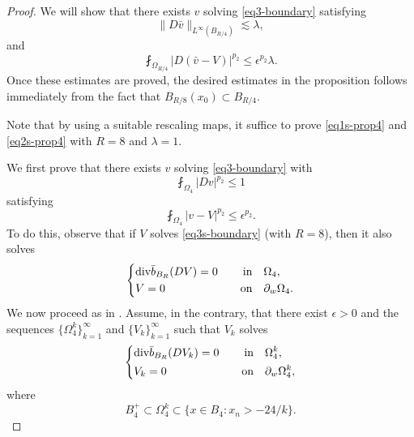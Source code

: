 \documentclass[a4paper,10pt]{amsart}
\newcommand{\lesi}{\lesssim}
\newcommand{\Om}{\Omega}
\newcommand{\vc}{\infty}
\newcommand{\di}{{\rm div}}
\begin{document}
\begin{proof}
	
	We will show that there exists $v$ solving \eqref{eq3-boundary} satisfying
	\begin{equation}\label{eq1s-prop4}
	\|D\bar{v}\|_{L^{\vc}(B_{R/4})}\lesi \lambda,
	\end{equation}
	and
	\begin{equation}
	\label{eq2s-prop4}
	\fint_{\Om_{R/4}}|D(\bar{v}-V)|^{p_2}\leq \epsilon^{p_2}\lambda.
	\end{equation}
	Once these estimates are proved, the desired estimates in the proposition follows 
	immediately from the fact that $B_{R/8}(x_0)\subset B_{R/4}$.
	
Note that by using a suitable rescaling maps, it suffice to prove \eqref{eq1s-prop4} and \eqref{eq2s-prop4} with $R=8$ and $\lambda=1$.

We first prove that there exists $v$ solving \eqref{eq3-boundary} with
	\begin{equation}\label{eq1s-prop3}
	\fint_{\Om_4}|Dv|^{p_2}\leq 1
	\end{equation}
	satisfying
	\begin{equation}\label{eq2s-prop3}
	\fint_{\Om_4}|v-V|^{p_2}\leq \epsilon^{p_2}.
	\end{equation}
	To do this, observe  that if $V$ solves \eqref{eq3s-boundary} (with $R=8$), then it also solves
	\begin{equation}\label{eq2s-boundary}
	\left\{
	\begin{aligned}
	&\di \bar{b}_{B_R}(DV)=0 \quad &\text{in}& \quad \Om_{4},\\
	&V=0  \quad &\text{on}& \quad \partial_w \Om_{4}.
	\end{aligned}
	\right.
	\end{equation}
		We now proceed as in \cite{BW, BOR}. Assume, in the contrary, that there exist $\epsilon>0$ and the sequences $\{\Om_4^k\}_{k=1}^\vc$ and $\{V_k\}_{k=1}^\vc$ such that $V_k$ solves 
	\begin{equation}\label{eq2sk-boundary}
	\left\{
	\begin{aligned}
	&\di \bar{b}_{B_R}(DV_k)=0 \quad &\text{in}& \quad \Om^k_{4},\\
	&V_k=0  \quad &\text{on}& \quad \partial_w \Om^k_{4},
	\end{aligned}
	\right.
	\end{equation}
	where
\begin{equation}\label{eq-geometriccondition}
B_4^+\subset \Omega^k_4\subset \{x\in B_4: x_n>-24/k\}.
\end{equation}


\end{proof}
\end{document}
